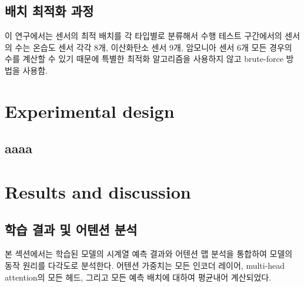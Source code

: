 \documentclass[final,5p,times,twocolumn,authoryear]{elsarticle}
\begin{document}
\subsection{배치 최적화 과정}
이 연구에서는 센서의 최적 배치를 각 타입별로 분류해서 수행
테스트 구간에서의 센서의 수는 온습도 센서 각각 8개, 이산화탄소 센서 9개, 암모니아 센서 6개
모든 경우의 수를 계산할 수 있기 때문에 특별한 최적화 알고리즘을 사용하지 않고 brute-force 방법을 사용함. 




\section{Experimental design}

\subsection{aaaa}

\section{Results and discussion}

\subsection{학습 결과 및 어텐션 분석}
본 섹션에서는 학습된 모델의 시계열 예측 결과와 어텐션 맵 분석을 통합하여 모델의 동작 원리를 다각도로 분석한다. 어텐션 가중치는 모든 인코더 레이어, multi-head attention의 모든 헤드, 그리고 모든 예측 배치에 대하여 평균내어 계산되었다.
\end{document}
